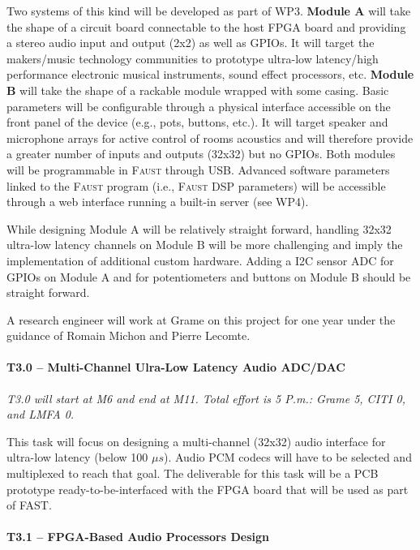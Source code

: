 \documentclass[a4paper,9pt]{extarticle}
\newcommand{\F}{\textsc{Faust}}
\newcommand{\PP}{FAST}
\begin{document}
Two systems of this kind will be developed as part of WP3. \textbf{Module A} will take the shape of a circuit board connectable to the host FPGA board and providing a stereo audio input and output (2x2) as well as GPIOs. It will target the makers/music technology communities to prototype ultra-low latency/high performance electronic musical instruments, sound effect processors, etc. \textbf{Module B} will take the shape of a rackable module wrapped with some casing. Basic parameters will be configurable through a physical interface accessible on the front panel of the device (e.g., pots, buttons, etc.). It will target speaker and microphone arrays for active control of rooms acoustics and will therefore provide a greater number of inputs and outputs (32x32) but no GPIOs. Both modules will be programmable in \F{} through USB. Advanced software parameters linked to the \F{} program (i.e., \F{} DSP parameters) will be accessible through a web interface running a built-in server (see WP4).

While designing Module A will be relatively straight forward, handling 32x32 ultra-low latency channels on Module B will be more challenging and imply the implementation of additional custom hardware. Adding a I2C sensor ADC for GPIOs on Module A and for potentiometers and buttons on Module B should be straight forward.  

A research engineer will work at Grame on this project for one year under the guidance of Romain Michon and Pierre Lecomte.

\paragraph{T3.0 -- Multi-Channel Ulra-Low Latency Audio ADC/DAC}

\textit{T3.0 will start at M6 and end at M11. Total effort is 5 P.m.: Grame 5, CITI 0, and LMFA 0.}

This task will focus on designing a multi-channel (32x32) audio interface for ultra-low latency (below 100 $\mu s$). Audio PCM codecs will have to be selected and multiplexed to reach that goal. The deliverable for this task will be a PCB prototype ready-to-be-interfaced with the FPGA board that will be used as part of \PP{}.  

\paragraph{T3.1 -- FPGA-Based Audio Processors Design}
\end{document}
